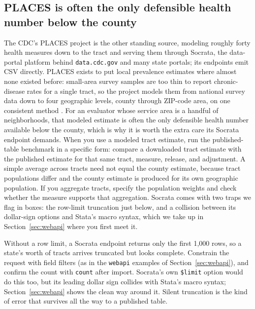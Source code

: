\documentclass[
    a4paper,
    fontsize=10pt,
    twoside=true,
    numbers=noenddot,
]{kaobook}
\newenvironment{vizcallout}[1][Visualization to build]{%
    \begin{vizbox}[frametitle={#1}]%
}{%
    \end{vizbox}%
}
\begin{document}
\subsection{PLACES is often the only defensible health number below the county}\label{ch03-places}
The CDC's PLACES project is the other standing source, modeling roughly forty health measures down to the tract and serving them through Socrata, the data-portal platform behind \texttt{data.cdc.gov} and many state portals; its endpoints emit CSV directly. PLACES exists to put local prevalence estimates where almost none existed before: small-area survey samples are too thin to report chronic-disease rates for a single tract, so the project models them from national survey data down to four geographic levels, county through ZIP-code area, on one consistent method \parencite{greenlund2022places}. For an evaluator whose service area is a handful of neighborhoods, that modeled estimate is often the only defensible health number available below the county, which is why it is worth the extra care its Socrata endpoint demands. When you use a modeled tract estimate, run the published-table benchmark in a specific form: compare a downloaded tract estimate with the published estimate for that same tract, measure, release, and adjustment. A simple average across tracts need not equal the county estimate, because tract populations differ and the county estimate is produced for its own geographic population. If you aggregate tracts, specify the population weights and check whether the measure supports that aggregation. Socrata comes with two traps we flag in boxes: the row-limit truncation just below, and a collision between its dollar-sign options and Stata's macro syntax, which we take up in Section~\ref{sec:webapi} where you first meet it.

\begin{vizcallout}[The Socrata truncation trap]
Without a row limit, a Socrata endpoint returns only the first 1{,}000 rows, so a state's worth of tracts arrives truncated but looks complete. Constrain the request with field filters (as in the \texttt{webapi} examples of Section~\ref{sec:webapi}), and confirm the count with \texttt{count} after import. Socrata's own \texttt{\$limit} option would do this too, but its leading dollar sign collides with Stata's macro syntax; Section~\ref{sec:webapi} shows the clean way around it. Silent truncation is the kind of error that survives all the way to a published table.
\end{vizcallout}
\end{document}
